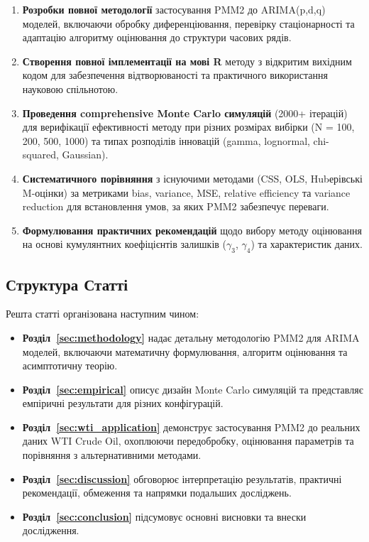 \documentclass[12pt,a4paper]{article}
\begin{document}
\begin{enumerate}
    \item \textbf{Розробки повної методології} застосування PMM2 до ARIMA(p,d,q) моделей, включаючи обробку диференціювання, перевірку стаціонарності та адаптацію алгоритму оцінювання до структури часових рядів.

    \item \textbf{Створення повної імплементації на мові R} методу з відкритим вихідним кодом для забезпечення відтворюваності та практичного використання науковою спільнотою.

    \item \textbf{Проведення comprehensive Monte Carlo симуляцій} (2000+ ітерацій) для верифікації ефективності методу при різних розмірах вибірки (N = 100, 200, 500, 1000) та типах розподілів інновацій (gamma, lognormal, chi-squared, Gaussian).

    \item \textbf{Систематичного порівняння} з існуючими методами (CSS, OLS, Hubерівські M-оцінки) за метриками bias, variance, MSE, relative efficiency та variance reduction для встановлення умов, за яких PMM2 забезпечує переваги.

    \item \textbf{Формулювання практичних рекомендацій} щодо вибору методу оцінювання на основі кумулянтних коефіцієнтів залишків ($\gamma_3$, $\gamma_4$) та характеристик даних.
\end{enumerate}

\subsection{Структура Статті}
\label{subsec:structure}

Решта статті організована наступним чином:

\begin{itemize}
    \item \textbf{Розділ~\ref{sec:methodology}} надає детальну методологію PMM2 для ARIMA моделей, включаючи математичну формулювання, алгоритм оцінювання та асимптотичну теорію.

    \item \textbf{Розділ~\ref{sec:empirical}} описує дизайн Monte Carlo симуляцій та представляє емпіричні результати для різних конфігурацій.

    \item \textbf{Розділ~\ref{sec:wti_application}} демонструє застосування PMM2 до реальних даних WTI Crude Oil, охоплюючи передобробку, оцінювання параметрів та порівняння з альтернативними методами.

    \item \textbf{Розділ~\ref{sec:discussion}} обговорює інтерпретацію результатів, практичні рекомендації, обмеження та напрямки подальших досліджень.

    \item \textbf{Розділ~\ref{sec:conclusion}} підсумовує основні висновки та внески дослідження.
\end{itemize}
\end{document}
